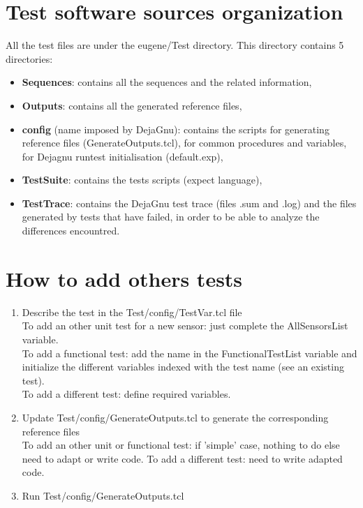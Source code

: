 \documentclass[a4paper,11pt]{article}
\begin{document}
\section{Test software sources organization}
All the test files are under the eugene/Test directory.
This directory contains 5 directories:
\begin{itemize}
\item {\bf Sequences}: contains all the sequences and the related information,
\item {\bf Outputs}: contains all the generated reference files,
\item {\bf config} (name imposed by DejaGnu): contains the scripts for generating reference files (GenerateOutputs.tcl), for common procedures and variables, for Dejagnu runtest initialisation (default.exp),
\item {\bf TestSuite}: contains the tests scripts (expect language),
\item {\bf TestTrace}: contains the DejaGnu test trace (files .sum and .log) and the files generated by tests that have failed, in order to be able to analyze the differences encountred.
\end{itemize}

\section{How to add others tests}
\begin{enumerate}
\item Describe the test in the Test/config/TestVar.tcl file\\
To add an other unit test for a new sensor: just complete the AllSensorsList variable.\\
To add a functional test: add the name in the FunctionalTestList variable and initialize the different variables indexed with the test name (see an existing test).\\
To add a different test: define required variables.\\
\item Update Test/config/GenerateOutputs.tcl to generate the corresponding reference files\\
To add an other unit or functional test: if 'simple' case, nothing to do else need to adapt or write code.
To add a different test: need to write adapted code.
\item Run Test/config/GenerateOutputs.tcl
\end{enumerate}
\end{document}
